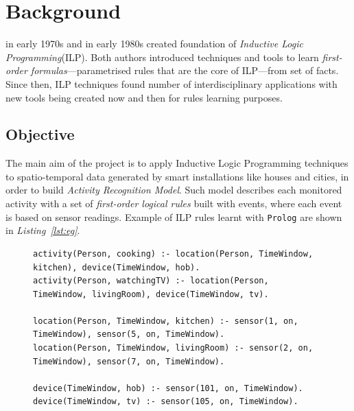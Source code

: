 \documentclass[12pt, a4paper, pdflatex, leqno, twoside]{report}
\newenvironment{dedication}
  {\clearpage               %
   \thispagestyle{empty}    %
   \vspace*{\stretch{1}}    %
   \itshape                 %
   \raggedright             %
   \par\setlength{\leftskip}{0.3\textwidth}\noindent\ignorespaces
  }
  {\par                     %
   \vspace{\stretch{3}}     %
   \clearpage               %
  }
\begin{document}



\newpage
\thispagestyle{empty}
\mbox{}

\newpage{
  \thispagestyle{empty}
  \cleardoublepage
  \pagestyle{plain}
  \tableofcontents
  \thispagestyle{empty}
}

\newpage
\thispagestyle{empty}
\mbox{}


\chapter{Background\label{chp:background}}
\setcounter{page}{1}

\citeauthor{plotkin1972automatic} in early 1970s and \citeauthor{shapiro1983algorithmic} in early 1980s created foundation of \emph{Inductive Logic Programming}(ILP). Both authors introduced techniques and tools to learn \emph{first-order formulas}---parametrised rules that are the core of ILP---from set of facts. Since then, ILP techniques found number of interdisciplinary applications with new tools being created now and then for rules learning purposes.

\section{Objective}
The main aim of the project is to apply Inductive Logic Programming techniques to spatio-temporal data generated by smart installations like houses and cities, in order to build \emph{Activity Recognition Model}. Such model describes each monitored activity with a set of \emph{first-order logical rules} built with events, where each event is based on sensor readings. Example of ILP rules learnt with \texttt{Prolog} are shown in \emph{Listing~\ref{lst:eg}}.

\vspace{1em}
\begin{figure}[htb]
\lstset{
  captionpos=b,
  frame=single,
  language=Prolog,
  breaklines=true,
  caption=Example of target rules.,
  label=lst:eg,
  float=tb
}
\begin{lstlisting}
activity(Person, cooking) :- location(Person, TimeWindow, kitchen), device(TimeWindow, hob).
activity(Person, watchingTV) :- location(Person, TimeWindow, livingRoom), device(TimeWindow, tv).

location(Person, TimeWindow, kitchen) :- sensor(1, on, TimeWindow), sensor(5, on, TimeWindow).
location(Person, TimeWindow, livingRoom) :- sensor(2, on, TimeWindow), sensor(7, on, TimeWindow).

device(TimeWindow, hob) :- sensor(101, on, TimeWindow).
device(TimeWindow, tv) :- sensor(105, on, TimeWindow).
\end{lstlisting}
\end{figure}
\end{document}
